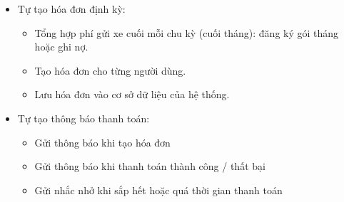 \documentclass[a4paper,12pt]{article}
\begin{document}
\begin{itemize}
    \item Tự tạo hóa đơn định kỳ:
    \vspace*{-5pt}
    \begin{itemize}
        \item Tổng hợp phí gửi xe cuối mỗi chu kỳ (cuối tháng): đăng ký gói tháng hoặc ghi nợ.
        \item Tạo hóa đơn cho từng người dùng.
        \item Lưu hóa đơn vào cơ sở dữ liệu của hệ thống.

    \end{itemize}
\end{itemize}
\begin{itemize}
    \item Tự tạo thông báo thanh toán:
    \vspace*{-5pt}
    \begin{itemize}
        \item Gửi thông báo khi tạo hóa đơn
        \item Gửi thông báo khi thanh toán thành công / thất bại
        \item Gửi nhắc nhở khi sắp hết hoặc quá thời gian thanh toán
    \end{itemize}
\end{itemize}
\end{document}
